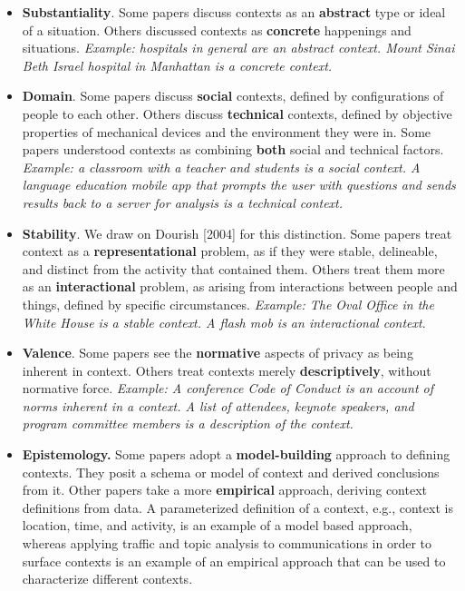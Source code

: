 \documentclass[../thesis.tex]{subfiles}
\newcommand\liststyleWWNumii{%
\renewcommand\labelitemi{${\bullet}$}
\renewcommand\labelitemii{${\circ}$}
\renewcommand\labelitemiii{${\blacksquare}$}
\renewcommand\labelitemiv{${\bullet}$}
}
\begin{document}
\liststyleWWNumii
\begin{itemize}
\item \textbf{Substantiality}. Some papers discuss contexts as an
\textbf{abstract} type or ideal of a situation. Others discussed
contexts as \textbf{concrete} happenings and situations.
\textit{Example: hospitals in general are an abstract context. Mount
Sinai Beth Israel hospital in Manhattan is a concrete context.}
\item \textbf{Domain}. Some papers discuss \textbf{social} contexts,
defined by configurations of people to each other. Others discuss
\textbf{technical} contexts, defined by objective properties of
mechanical devices and the environment they were in. Some papers
understood contexts as combining \textbf{both} social and technical
factors. \textit{Example: a classroom with a teacher and students is a
social context. A language education mobile app that prompts the user
with questions and sends results back to a server for analysis is a
technical context.}
\item \textbf{Stability}. We draw on Dourish [2004] for this
distinction. Some papers treat context as a \textbf{representational}
problem, as if they were stable, delineable, and distinct from the
activity that contained them. Others treat them more as an
\textbf{interactional} problem, as arising from interactions between
people and things, defined by specific circumstances. \textit{Example:
The Oval Office in the White House is a stable context. A flash mob is
an interactional context}.
\item \textbf{Valence}. Some papers see the \textbf{normative} aspects
of privacy as being inherent in context. Others treat contexts merely
\textbf{descriptively}, without normative force. \textit{Example: A
conference Code of Conduct is an account of norms inherent in a
context. A list of attendees, keynote speakers, and program committee
members is a description of the context.}
\item \textbf{Epistemology. }Some papers adopt a \textbf{model-building}
approach to defining contexts. They posit a schema or model of context
and derived conclusions from it. Other papers take a more
\textbf{empirical} approach, deriving context definitions from data. A
parameterized definition of a context, e.g., context is location, time,
and activity, is an example of a model based approach, whereas applying
traffic and topic analysis to communications in order to surface
contexts is an example of an empirical approach that can be used to
characterize different contexts.
\end{itemize}
\end{document}
